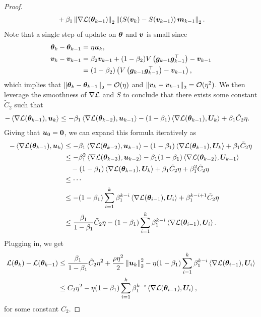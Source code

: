 \begin{proof}
\begin{align*}
        &\quad + \beta_1 \left\|\nabla\mathcal{L}({\bm{\theta}}_{k-1})\right\|_2\left\|\left(S({\bm{v}}_{k})-S({\bm{v}}_{k-1})\right){\bm{m}}_{k-1}\right\|_2.
    \end{align*}
    Note that a single step of update on ${\bm{\theta}}$ and ${\bm{v}}$ is small since \begin{align*}
        {\bm{\theta}}_{k} - {\bm{\theta}}_{k-1} &= \eta {\bm{u}}_k, \\
        {\bm{v}}_{k} - {\bm{v}}_{k-1} &= \beta_2 {\bm{v}}_{k-1} + (1-\beta_2) V\left({\bm{g}}_{k-1} {\bm{g}}_{k-1}^\top\right) - {\bm{v}}_{k-1} \\
        &= (1-\beta_2) \left(V\left({\bm{g}}_{k-1} {\bm{g}}_{k-1}^\top\right) - {\bm{v}}_{k-1}\right),
    \end{align*}  
    which implies that $\left\|{\bm{\theta}}_{k} - {\bm{\theta}}_{k-1}\right\|_2 = \mathcal{O}(\eta)$ and $\left\|{\bm{v}}_{k} - {\bm{v}}_{k-1}\right\|_2 = \mathcal{O}(\eta^2)$. We then leverage the smoothness of $\nabla \mathcal{L}$ and $S$ to conclude that there exists some constant $\tilde{C}_2$ such that
    \begin{align*}
    - \left\langle \nabla \mathcal{L}({\bm{\theta}}_{k-1}), {\bm{u}}_k \right\rangle 
        & \leq - \beta_1\left\langle \nabla \mathcal{L}({\bm{\theta}}_{k-2}), {\bm{u}}_{k-1}\right\rangle - (1-\beta_1)\left\langle \nabla \mathcal{L}({\bm{\theta}}_{k-1}),{\bm{U}}_k\right\rangle + \beta_1 \tilde{C}_2 \eta.
    \end{align*} 
    Giving that ${\bm{u}}_{0} = \bold{0}$, we can expand this formula iteratively as \begin{align*}
        - \left\langle \nabla \mathcal{L}({\bm{\theta}}_{k-1}), {\bm{u}}_k \right\rangle 
        & \leq - \beta_1\left\langle \nabla \mathcal{L}({\bm{\theta}}_{k-2}), {\bm{u}}_{k-1}\right\rangle - (1-\beta_1)\left\langle \nabla \mathcal{L}({\bm{\theta}}_{k-1}),{\bm{U}}_k\right\rangle + \beta_1 \tilde{C}_2 \eta \\
        & \leq -\beta_1^2 \left\langle \nabla \mathcal{L}({\bm{\theta}}_{k-3}), {\bm{u}}_{k-2}\right\rangle - \beta_1(1-\beta_1)\left\langle \nabla \mathcal{L}({\bm{\theta}}_{k-2}),{\bm{U}}_{k-1}\right\rangle \\
        & \quad - (1-\beta_1)\left\langle \nabla \mathcal{L}({\bm{\theta}}_{k-1}),{\bm{U}}_k\right\rangle + \beta_1\tilde{C}_2 \eta + \beta_1^2\tilde{C}_2 \eta \\
        & \leq \cdots \\
        & \leq -(1-\beta_1)\sum_{i=1}^{k} \beta_1^{k-i}\left\langle \nabla\mathcal{L}({\bm{\theta}}_{i-1}), {\bm{U}}_i \right\rangle + \beta_1^{k-i+1} \tilde{C}_2 \eta \\
        & \leq \frac{\beta_1}{1-\beta_1} \tilde{C}_2 \eta - (1-\beta_1)\sum_{i=1}^{k} \beta_1^{k-i}\left\langle \nabla\mathcal{L}({\bm{\theta}}_{i-1}), {\bm{U}}_i \right\rangle.
    \end{align*}
    Plugging in, we get \begin{align*}
        \mathcal{L}({\bm{\theta}}_{k}) - \mathcal{L}({\bm{\theta}}_{k-1}) & \leq \frac{\beta_1}{1-\beta_1} \tilde{C}_2 \eta^2 + \frac{\rho\eta^2}{2} \left\|{\bm{u}}_k\right\|_2^2 -\eta (1-\beta_1)\sum_{i=1}^{k} \beta_1^{k-i}\left\langle \nabla\mathcal{L}({\bm{\theta}}_{i-1}), {\bm{U}}_i \right\rangle   \\
        &\leq  C_2 \eta^2 -\eta (1-\beta_1)\sum_{i=1}^{k} \beta_1^{k-i}\left\langle \nabla\mathcal{L}({\bm{\theta}}_{i-1}), {\bm{U}}_i \right\rangle,
    \end{align*}
    for some constant $C_2$.
\end{proof}


